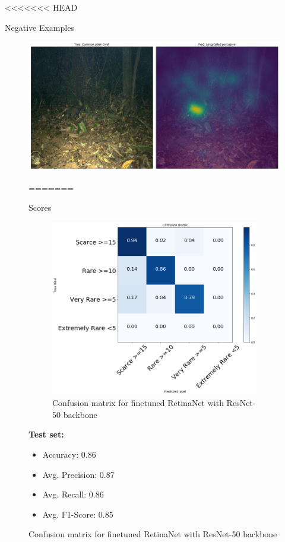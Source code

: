 \documentclass[10pt]{beamer}
\begin{document}

<<<<<<< HEAD
\begin{frame}{Negative Examples}
	\centering
	\begin{figure}
		\includegraphics[width=\columnwidth]{images/Attention_wrong.png}
		\caption{Correct Attention, wrong label}
=======
\begin{frame}{Scores}
	\centering
	\begin{minipage}[c]{0.58\linewidth}
		\begin{figure}
			\includegraphics[width=\columnwidth]{images/conf_mat_leo_retina.png}
			\caption{Confusion matrix for finetuned RetinaNet with ResNet-50 backbone}
		\end{figure}
	\end{minipage}
	\begin{minipage}[c]{0.38\linewidth}
		\textbf{Test set:}
		\begin{itemize}
			\item Accuracy: 0.86
			\item Avg. Precision:  0.87
			\item Avg. Recall: 0.86
			\item Avg. F1-Score: 0.85
		\end{itemize}
	\end{minipage}
\end{frame}


\end{figure}
\end{frame}
\end{document}
